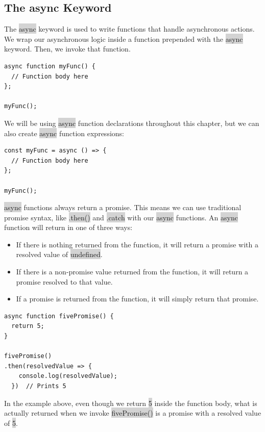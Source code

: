 \documentclass[11pt]{article}
\begin{document}
\subsection{The async Keyword}
The \colorbox{lightgray}{async} keyword is used to write functions that handle asynchronous actions. We wrap our asynchronous logic inside a function prepended with the \colorbox{lightgray}{async} keyword. Then, we invoke that function.
\begin{lstlisting}
async function myFunc() {
  // Function body here
};

myFunc();
\end{lstlisting}
We will be using \colorbox{lightgray}{async} function declarations throughout this chapter, but we can also create \colorbox{lightgray}{async} function expressions:
\begin{lstlisting}
const myFunc = async () => {
  // Function body here
};

myFunc();
\end{lstlisting}
\colorbox{lightgray}{async} functions always return a promise. This means we can use traditional promise syntax, like \colorbox{lightgray}{.then()} and \colorbox{lightgray}{.catch} with our \colorbox{lightgray}{async} functions. An \colorbox{lightgray}{async} function will return in one of three ways:
\begin{itemize}[leftmargin = *]
\item If there is nothing returned from the function, it will return a promise with a resolved value of \colorbox{lightgray}{undefined}.
\item If there is a non-promise value returned from the function, it will return a promise resolved to that value.
\item If a promise is returned from the function, it will simply return that promise. 
\end{itemize}
\begin{lstlisting}
async function fivePromise() { 
  return 5;
}

fivePromise()
.then(resolvedValue => {
    console.log(resolvedValue);
  })  // Prints 5
\end{lstlisting}
In the example above, even though we return \colorbox{lightgray}{5} inside the function body, what is actually returned when we invoke \colorbox{lightgray}{fivePromise()} is a promise with a resolved value of \colorbox{lightgray}{5}.
\end{document}

